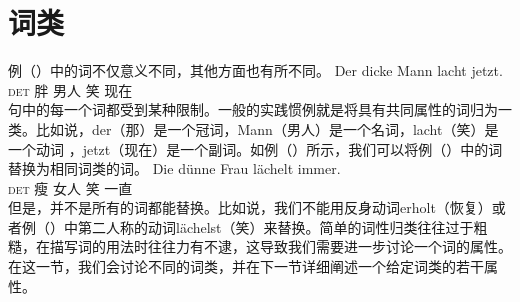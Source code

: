 \section{词类}
\label{Abschnitt-Wortarten}
例（）中的词不仅意义不同，其他方面也有所不同。
\ea
\gll Der dicke Mann lacht jetzt.\\
	 \textsc{det} 胖 男人 笑 现在\\
\z
句中的每一个词都受到某种限制。一般的实践惯例就是将具有共同属性的词归为一类。比如说，der（那）是一个冠词，Mann（男人）是一个名词，lacht（笑）是一个动词 ，jetzt（现在）是一个副词。如例（）所示，我们可以将例（）中的词替换为相同词类的词。
\ea
\gll Die dünne Frau lächelt immer.\\
	 \textsc{det} 瘦 女人 笑 一直\\
\z
但是，并不是所有的词都能替换。比如说，我们不能用反身动词erholt（恢复）或者例（）中第二人称的动词lächelst（笑）来替换。简单的词性归类往往过于粗糙，在描写词的用法时往往力有不逮，这导致我们需要进一步讨论一个词的属性。在这一节，我们会讨论不同的词类，并在下一节详细阐述一个给定词类的若干属性。

